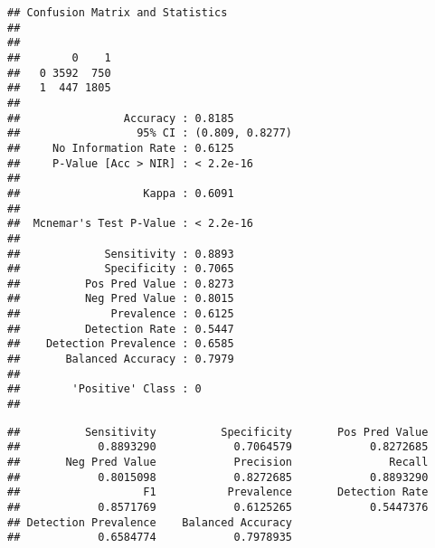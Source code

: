 \documentclass[
]{article}
\newenvironment{Shaded}{\begin{snugshade}}{\end{snugshade}}
\newcommand{\FloatTok}[1]{\textcolor[rgb]{0.00,0.00,0.81}{#1}}
\newcommand{\FunctionTok}[1]{\textcolor[rgb]{0.00,0.00,0.00}{#1}}
\newcommand{\NormalTok}[1]{#1}
\newcommand{\OtherTok}[1]{\textcolor[rgb]{0.56,0.35,0.01}{#1}}
\newcommand{\SpecialCharTok}[1]{\textcolor[rgb]{0.00,0.00,0.00}{#1}}
\begin{document}
\begin{Shaded}
\end{Shaded}

\begin{verbatim}
## Confusion Matrix and Statistics
## 
##    
##        0    1
##   0 3592  750
##   1  447 1805
##                                          
##                Accuracy : 0.8185         
##                  95% CI : (0.809, 0.8277)
##     No Information Rate : 0.6125         
##     P-Value [Acc > NIR] : < 2.2e-16      
##                                          
##                   Kappa : 0.6091         
##                                          
##  Mcnemar's Test P-Value : < 2.2e-16      
##                                          
##             Sensitivity : 0.8893         
##             Specificity : 0.7065         
##          Pos Pred Value : 0.8273         
##          Neg Pred Value : 0.8015         
##              Prevalence : 0.6125         
##          Detection Rate : 0.5447         
##    Detection Prevalence : 0.6585         
##       Balanced Accuracy : 0.7979         
##                                          
##        'Positive' Class : 0              
## 
\end{verbatim}

\begin{Shaded}
\end{Shaded}

\begin{verbatim}
##          Sensitivity          Specificity       Pos Pred Value 
##            0.8893290            0.7064579            0.8272685 
##       Neg Pred Value            Precision               Recall 
##            0.8015098            0.8272685            0.8893290 
##                   F1           Prevalence       Detection Rate 
##            0.8571769            0.6125265            0.5447376 
## Detection Prevalence    Balanced Accuracy 
##            0.6584774            0.7978935
\end{verbatim}
\end{document}
